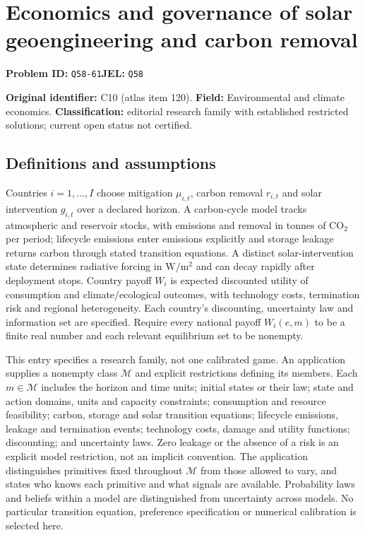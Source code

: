 \documentclass[11pt,a4paper]{article}
\begin{document}
\section*{Economics and governance of solar geoengineering and carbon removal}
\textbf{Problem ID:} \texttt{Q58-61}\quad \textbf{JEL:} \texttt{Q58}\par
\label{problem:OP-0120}
\label{atlas:prob:C10}

\noindent\textbf{Original identifier:} C10 (atlas item 120). \textbf{Field:} Environmental and climate economics. \textbf{Classification:} editorial research family with established restricted solutions; current open status not certified.

\subsection*{Definitions and assumptions}

Countries $i=1,\ldots,I$ choose mitigation $\mu_{i,t}$, carbon removal $r_{i,t}$ and solar intervention $g_{i,t}$ over a declared horizon. A carbon-cycle model tracks atmospheric and reservoir stocks, with emissions and removal in tonnes of $\mathrm{CO}_2$ per period; lifecycle emissions enter emissions explicitly and storage leakage returns carbon through stated transition equations. A distinct solar-intervention state determines radiative forcing in $\mathrm W/\mathrm m^2$ and can decay rapidly after deployment stops. Country payoff $W_i$ is expected discounted utility of consumption and climate/ecological outcomes, with technology costs, termination risk and regional heterogeneity. Each country's discounting, uncertainty law and information set are specified. Require every national payoff $W_i(e,m)$ to be a finite real number and each relevant equilibrium set to be nonempty.

This entry specifies a research family, not one calibrated game. An application supplies a nonempty class $\mathcal M$ and explicit restrictions defining its members. Each $m\in\mathcal M$ includes the horizon and time units; initial states or their law; state and action domains, units and capacity constraints; consumption and resource feasibility; carbon, storage and solar transition equations; lifecycle emissions, leakage and termination events; technology costs, damage and utility functions; discounting; and uncertainty laws. Zero leakage or the absence of a risk is an explicit model restriction, not an implicit convention. The application distinguishes primitives fixed throughout $\mathcal M$ from those allowed to vary, and states who knows each primitive and what signals are available. Probability laws and beliefs within a model are distinguished from uncertainty across models. No particular transition equation, preference specification or numerical calibration is selected here.
\end{document}
